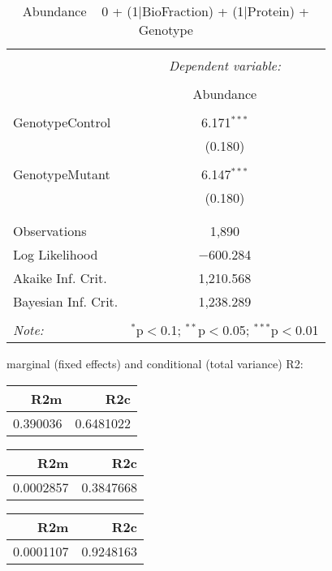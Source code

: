\documentclass[11pt]{report}
\begin{document}
\begin{table}[!htbp] \centering 
  \caption{Abundance ~ 0 + (1|BioFraction) + (1|Protein) + Genotype} 
  \label{} 
\begin{tabular}{@{\extracolsep{5pt}}lc} 
\\[-1.8ex]\hline 
\hline \\[-1.8ex] 
 & \multicolumn{1}{c}{\textit{Dependent variable:}} \\ 
\cline{2-2} 
\\[-1.8ex] & Abundance \\ 
\hline \\[-1.8ex] 
 GenotypeControl & 6.171$^{***}$ \\ 
  & (0.180) \\ 
  & \\ 
 GenotypeMutant & 6.147$^{***}$ \\ 
  & (0.180) \\ 
  & \\ 
\hline \\[-1.8ex] 
Observations & 1,890 \\ 
Log Likelihood & $-$600.284 \\ 
Akaike Inf. Crit. & 1,210.568 \\ 
Bayesian Inf. Crit. & 1,238.289 \\ 
\hline 
\hline \\[-1.8ex] 
\textit{Note:}  & \multicolumn{1}{r}{$^{*}$p$<$0.1; $^{**}$p$<$0.05; $^{***}$p$<$0.01} \\ 
\end{tabular} 
\end{table} 
marginal (fixed effects) and conditional (total variance) R2:

\begin{tabular}{r|r}
\hline
R2m & R2c\\
\hline
0.390036 & 0.6481022\\
\hline
\end{tabular}

\begin{tabular}{r|r}
\hline
R2m & R2c\\
\hline
0.0002857 & 0.3847668\\
\hline
\end{tabular}

\begin{tabular}{r|r}
\hline
R2m & R2c\\
\hline
0.0001107 & 0.9248163\\
\hline
\end{tabular}
\end{document}
